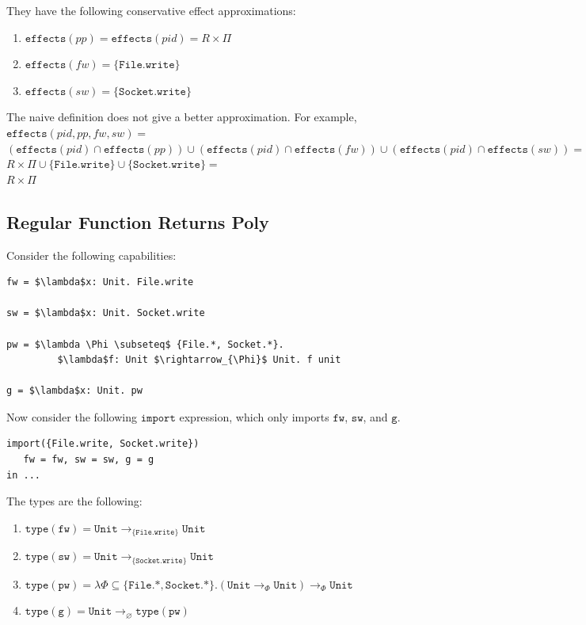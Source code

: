 \documentclass{llncs}
\newcommand{\keywadj}[1]{\mathtt{#1}}
\newcommand{\kwa}[1]{\keywadj{ #1 }}
\newcommand{\Unit}[0]{ \kwa{Unit} }
\newcommand{\fx}[1]{ \kwa{effects}(#1) }
\begin{document}
\noindent
They have the following conservative effect approximations:

\begin{enumerate}
	\item $\fx{pp} = \fx{pid} = R \times \Pi$
	\item $\fx{fw} = \{\kwa{File.write}\}$
	\item $\fx{sw} = \{\kwa{Socket.write}\}$
\end{enumerate}

\noindent
The naive definition does not give a better approximation. For example,\\

\noindent
$\kwa{effects}(pid, {pp, fw, sw}) =$ \\
$(\fx{pid} \cap \fx{pp}) \cup (\fx{pid} \cap \fx{fw}) \cup (\fx{pid} \cap \fx{sw}) = $ \\
$R \times \Pi \cup \{\kwa{File.write}\} \cup \{\kwa{Socket.write}\} =$\\
$R \times \Pi$



\subsection{Regular Function Returns Poly}

Consider the following capabilities:

\begin{lstlisting}
fw = $\lambda$x: Unit. File.write

sw = $\lambda$x: Unit. Socket.write

pw = $\lambda \Phi \subseteq$ {File.*, Socket.*}.
         $\lambda$f: Unit $\rightarrow_{\Phi}$ Unit. f unit

g = $\lambda$x: Unit. pw
\end{lstlisting}

\noindent
Now consider the following $\kwa{import}$ expression, which only imports $\kwa{fw}$, $\kwa{sw}$, and $\kwa{g}$.

\begin{lstlisting}
import({File.write, Socket.write})
   fw = fw, sw = sw, g = g
in ...
\end{lstlisting}

\noindent
The types are the following:

\begin{enumerate}
   \item $\kwa{type(fw)} = \Unit \rightarrow_{\kwa{\{File.write\}}} \Unit$
   \item $\kwa{type(sw)} = \Unit \rightarrow_{\kwa{\{Socket.write\}}} \Unit$
   \item $\kwa{type(pw)} = \lambda \Phi \subseteq \kwa{\{File.*, Socket.*\}}. (\Unit \rightarrow_{\Phi} \Unit) \rightarrow_{\Phi} \Unit$
   \item $\kwa{type(g)} = \Unit \rightarrow_{\varnothing} \kwa{type(pw)} $
\end{enumerate}
\end{document}
